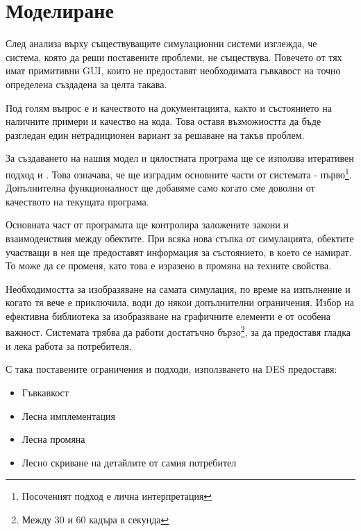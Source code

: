 \section{Моделиране}
	
	След анализа върху съществуващите симулационни системи изглежда, че
	система, която да реши поставените проблеми, не съществува.
	Повечето от тях имат примитивни \ac{GUI}, които не предоставят
	необходимата гъвкавост на точно определена създадена за целта такава.
	
	Под голям въпрос е и качеството на документацията, както и състоянието на
	наличните примери и качество на кода. Това оставя възможността да бъде разгледан
	един нетрадиционен вариант за решаване на такъв проблем.
	
	За създаването на нашия модел и цялостната програма ще се използва итеративен подход \cite{Shore} и \cite{Rasmusson}.
	Това означава, че ще изградим основните части от системата - 
	първо\footnote{Посоченият подход е лична интерпретация}. Допълнителна 
	функционалност ще добавяме само когато сме доволни от качеството на текущата програма. 
			
	Основната част от програмата ще контролира заложените закони и взаимодеиствия между обектите.
	При всяка нова стъпка от симулацията, обектите участващи в нея ще предоставят информация за
	състоянието, в което се намират. То може да се променя, като това е изразено в промяна
	на техните свойства.
	
	Необходимостта за изобразяване на самата симулация, по време на изпълнение и когато тя вече е приключила,
	води до някои допълнителни ограничения. Избор на ефективна библиотека за
	изобразяване на графичните елементи е от особена важност. Системата трябва да работи достатъчно 
	бързо\footnote{Между 30 и 60 кадъра в секунда}, за да предоставя гладка и лека работа за потребителя.
	
	С така поставените ограничения и подходи, използването на \ac{DES} предоставя:
	
	\begin{itemize}
		\item Гъвкавкост
		
		\item Лесна имплементация
		
		\item Лесна промяна
		
		\item Лесно скриване на детайлите от самия потребител	
				
	\end{itemize}				
	

